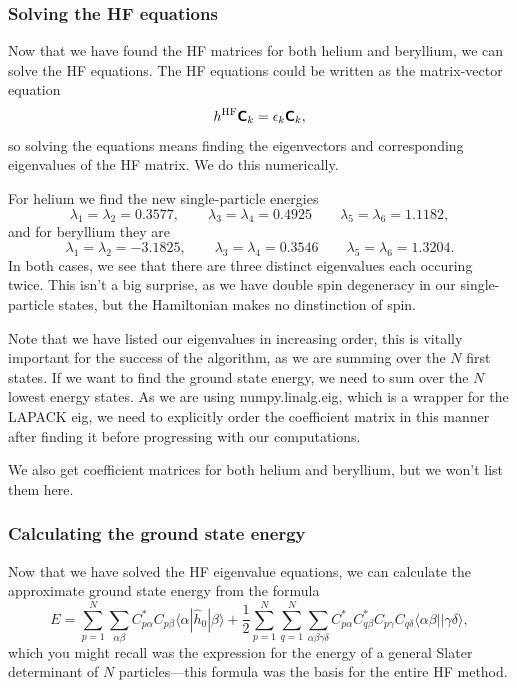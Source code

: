 \documentclass[a4paper, 11pt, notitlepage, english]{article}
\newcommand{\braket}[2]{\langle #1 | #2 \rangle}
\newcommand{\op}[1]{\hat{#1}}
\newcommand{\braopket}[3]{\langle #1 | {#2} | #3 \rangle}
\newcommand{\eps}{\epsilon}
\newcommand{\mat}[1]{\textsf{\textbf{#1}}}
\begin{document}
\clearpage

\subsubsection*{Solving the HF equations}
Now that we have found the HF matrices for both helium and beryllium, we can solve the HF equations. The HF equations could be written as the matrix-vector equation
$$h^{\rm HF} \mat{C}_k = \eps_k \mat{C}_k,$$
so solving the equations means finding the eigenvectors and corresponding eigenvalues of the HF matrix. We do this numerically. 

For helium we find the new single-particle energies
$$\lambda_1 = \lambda_2 = 0.3577, \qquad \lambda_3=\lambda_4 = 0.4925 \qquad \lambda_5 = \lambda_6 = 1.1182,$$
and for beryllium they are
$$\lambda_1 = \lambda_2 = -3.1825, \qquad \lambda_3=\lambda_4 = 0.3546 \qquad \lambda_5 = \lambda_6 = 1.3204.$$
In both cases, we see that there are three distinct eigenvalues each occuring twice. This isn't a big surprise, as we have double spin degeneracy in our single-particle states, but the Hamiltonian makes no dinstinction of spin. 

Note that we have listed our eigenvalues in increasing order, this is vitally important for the success of the algorithm, as we are summing over the $N$ first states. If we want to find the ground state energy, we need to sum over the $N$ lowest energy states. As we are using numpy.linalg.eig, which is a wrapper for the LAPACK eig, we need to explicitly order the coefficient matrix in this manner after finding it before progressing with our computations.

We also get coefficient matrices for both helium and beryllium, but we won't list them here.

\subsubsection*{Calculating the ground state energy}
Now that we have solved the HF eigenvalue equations, we can calculate the approximate ground state energy from the formula
$$E = \sum_{p=1}^N \sum_{\alpha \beta} C^*_{p \alpha} C_{p \beta}\braopket{\alpha}{\op{h}_0}{\beta} + \frac{1}{2}\sum_{p=1}^N\sum_{q=1}^N\sum_{\alpha\beta\gamma\delta} C_{p\alpha}^* C_{q \beta}^* C_{p \gamma} C_{q \delta} \braket{\alpha\beta|}{\gamma\delta},$$
which you might recall was the expression for the energy of a general Slater determinant of $N$ particles---this formula was the basis for the entire HF method.
\end{document}
